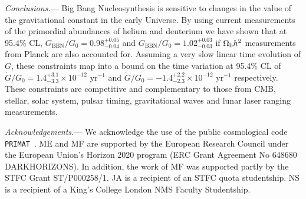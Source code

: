 \documentclass[notitlepage,twocolumn,letterpaper,natbib,aps,prl,amsmath,amsfonts,nofootinbib,preprintnumbers,superscriptaddress,secnumarabic,groupedaddress]{revtex4-1}
\begin{document}

\emph{Conclusions.}--- Big Bang Nucleosynthesis is sensitive to changes in the value of the gravitational constant in the early Universe. By using current measurements of the primordial abundances of helium and deuterium we have shown that at 95.4\% CL, $G_\mathrm{BBN}/G_0 = 0.98^{+0.05}_{-0.04}$ and $G_\mathrm{BBN}/G_0 = 1.02^{+0.03}_{-0.03}$ if $\Omega_{\rm b}h^2$ measurements from Planck are also accounted for. Assuming a very slow linear time evolution of $G$, these constraints map into a bound on the time variation at 95.4\% CL of $\dot{G}/G_0 = 1.4^{+3.1}_{-3.3}\times 10^{-12}\,\, \mathrm{yr}^{-1}$ and $\dot{G}/G_0 = -1.4^{+2.2}_{-2.3}\times 10^{-12}\,\, \mathrm{yr}^{-1}$ respectively. These constraints are competitive and complementary to those from CMB, stellar, solar system, pulsar timing, gravitational waves and lunar laser ranging measurements.
\setlength\parskip{10pt}

\emph{Acknowledgements.}--- We acknowledge the use of the public cosmological code \texttt{PRIMAT}~\cite{Pitrou:2018cgg}. ME and MF are supported by the European Research Council under the European Union's Horizon 2020 program (ERC Grant Agreement No 648680 DARKHORIZONS). In addition, the work of MF was supported partly by the STFC Grant ST/P000258/1. JA is a recipient of an STFC quota studentship. NS is a recipient of a King's College London NMS Faculty Studentship.


\end{document}
